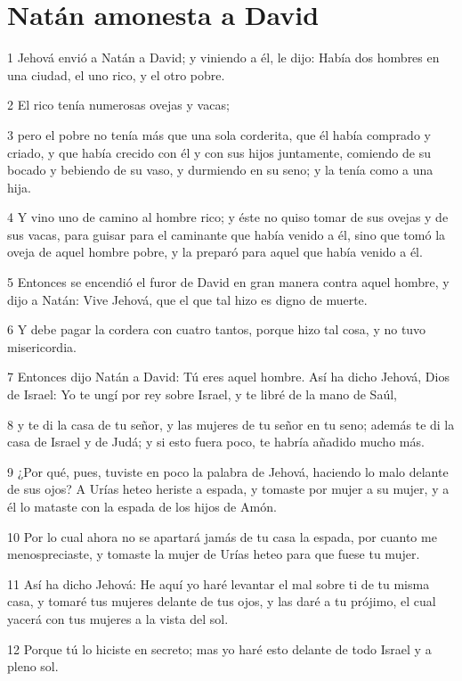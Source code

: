 \section*{Natán amonesta a David}

\par 1 Jehová envió a Natán a David; y viniendo a él, le dijo: Había dos hombres en una ciudad, el uno rico, y el otro pobre.
\par 2 El rico tenía numerosas ovejas y vacas;
\par 3 pero el pobre no tenía más que una sola corderita, que él había comprado y criado, y que había crecido con él y con sus hijos juntamente, comiendo de su bocado y bebiendo de su vaso, y durmiendo en su seno; y la tenía como a una hija.
\par 4 Y vino uno de camino al hombre rico; y éste no quiso tomar de sus ovejas y de sus vacas, para guisar para el caminante que había venido a él, sino que tomó la oveja de aquel hombre pobre, y la preparó para aquel que había venido a él.
\par 5 Entonces se encendió el furor de David en gran manera contra aquel hombre, y dijo a Natán: Vive Jehová, que el que tal hizo es digno de muerte.
\par 6 Y debe pagar la cordera con cuatro tantos, porque hizo tal cosa, y no tuvo misericordia.
\par 7 Entonces dijo Natán a David: Tú eres aquel hombre. Así ha dicho Jehová, Dios de Israel: Yo te ungí por rey sobre Israel, y te libré de la mano de Saúl,
\par 8 y te di la casa de tu señor, y las mujeres de tu señor en tu seno; además te di la casa de Israel y de Judá; y si esto fuera poco, te habría añadido mucho más.
\par 9 ¿Por qué, pues, tuviste en poco la palabra de Jehová, haciendo lo malo delante de sus ojos? A Urías heteo heriste a espada, y tomaste por mujer a su mujer, y a él lo mataste con la espada de los hijos de Amón.
\par 10 Por lo cual ahora no se apartará jamás de tu casa la espada, por cuanto me menospreciaste, y tomaste la mujer de Urías heteo para que fuese tu mujer.
\par 11 Así ha dicho Jehová: He aquí yo haré levantar el mal sobre ti de tu misma casa, y tomaré tus mujeres delante de tus ojos, y las daré a tu prójimo, el cual yacerá con tus mujeres a la vista del sol.
\par 12 Porque tú lo hiciste en secreto; mas yo haré esto delante de todo Israel y a pleno sol. 
